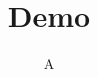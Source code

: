 \documentclass{modernposter}
\title{Demo}
\author{A}

\maketitle
\begin{postercolumn}
\end{postercolumn}

